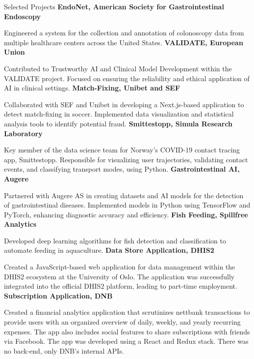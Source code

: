 \begin{rubric}{Selected Projects}
%
\entry*[2023]%
\textbf{EndoNet, American Society for Gastrointestinal Endoscopy} \par
Engineered a system for the collection and annotation of colonoscopy data from multiple healthcare centers across the United States.
%
\entry*[2023]%
\textbf{VALIDATE, European Union} \par 
Contributed to Trustworthy AI and Clinical Model Development within the VALIDATE project.
Focused on ensuring the reliability and ethical application of AI in clinical settings.
%
\entry*[2022]%
\textbf{Match-Fixing, Unibet and SEF} \par 
Collaborated with SEF and Unibet in developing a Next.js-based application to detect match-fixing in soccer.
Implemented data visualization and statistical analysis tools to identify potential fraud.
%
\entry*[2020]%
\textbf{Smittestopp, Simula Research Laboratory} \par
Key member of the data science team for Norway's COVID-19 contact tracing app, Smittestopp.
Responsible for visualizing user trajectories, validating contact events, and classifying transport modes, using Python.
%
\entry*[2019]%
\textbf{Gastrointestinal AI, Augere} \par
Partnered with Augere AS in creating datasets and AI models for the detection of gastrointestinal diseases.
Implemented models in Python using TensorFlow and PyTorch, enhancing diagnostic accuracy and efficiency.
%
\entry*[2018]%
\textbf{Fish Feeding, Spillfree Analytics} \par
Developed deep learning algorithms for fish detection and classification to automate feeding in aquaculture.
%
\entry*[2017]%
\textbf{Data Store Application, DHIS2} \par
Created a JavaScript-based web application for data management within the DHIS2 ecosystem at the University of Oslo.
The application was successfully integrated into the official DHIS2 platform, leading to part-time employment.
%
\entry*[2017]%
\textbf{Subscription Application, DNB} \par
Created a financial analytics application that scrutinizes nettbank transactions to provide users with an organized overview of daily, weekly, and yearly recurring expenses. The app also includes social features to share subscriptions with friends via Facebook. The app was developed using a React and Redux stack. There was no back-end, only DNB's internal APIs.
%
\end{rubric}